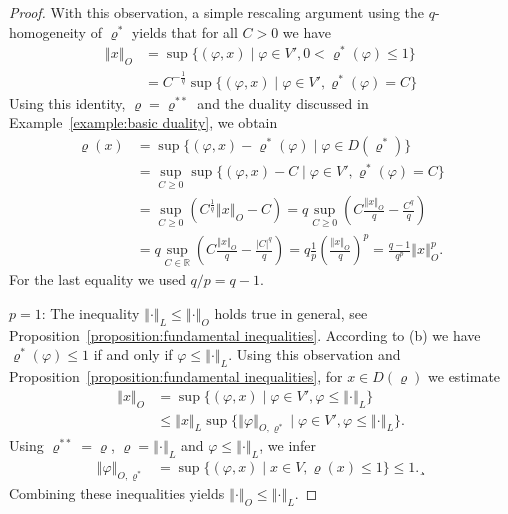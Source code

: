 \documentclass[a4paper,11pt,reqno]{amsart}
\theoremstyle{definition}
\numberwithin{equation}{section}
\newcommand{\R}{{\mathbb R}}
\newcommand{\vr}{{\varrho}}
\newcommand{\av}[1]{\left\Vert #1\right\Vert}
\newcommand{\1}{\mathds{1}}
\begin{document}
\begin{proof}
With  this observation, a simple rescaling argument using the $q$-homogeneity of $\vr^*$ yields that for all $C > 0$ we have
%
\begin{align*}
 \av{x}_O &= \sup \{(\varphi,x) \mid \varphi \in V', 0 <  \vr^*(\varphi) \leq 1 \}\\
 &= C^{-\frac{1}{q}} \sup \{(\varphi,x) \mid \varphi \in V', \vr^*(\varphi) = C\}
\end{align*}
%
 Using this identity, $\vr = \vr^{**}$ and the duality discussed in Example~\ref{example:basic duality},  we obtain 
 \begin{align*}
  \vr(x) &= \sup\{(\varphi,x) - \vr^*(\varphi) \mid \varphi \in D(\vr^*)\} \\
  &= \sup_{C \geq 0} \sup \{ (\varphi,x) - C \mid \varphi \in V', \vr^*(\varphi) = C\}\\
  &=  \sup_{C \geq 0}  \left(C^\frac{1}{q} \av{x}_O - C \right) = q \sup_{C \geq 0}  \left(C \frac{\av{x}_O}{q} - \frac{C^q}{q} \right) \\
  &= q \sup_{C \in \R}  \left(C \frac{\av{x}_O}{q} - \frac{|C|^q}{q} \right)  = q \frac{1}{p} \left(\frac{\av{x}_O}{q}\right)^p = \frac{q-1}{q^p} \av{x}_O^p.
 \end{align*}
%
For the last equality we used $q/p = q - 1$. 

 $p = 1$: The inequality $\av{\cdot}_L \leq \av{\cdot}_O$ holds true in general, see Proposition~\ref{proposition:fundamental inequalities}. According to (b) we have  $\vr^*(\varphi) \leq 1$ if and only if $\varphi \leq \av{\cdot}_L$. Using this observation and  Proposition~\ref{proposition:fundamental inequalities},  for  $x \in D(\vr)$ we estimate
 \begin{align*}
 \av{x}_O &= \sup\{(\varphi,x) \mid \varphi \in V', \varphi \leq \av{\cdot}_L\} \\
 &\leq \av{x}_L \sup\{ \av{\varphi}_{O,\vr^*} \mid \varphi \in V', \varphi \leq \av{\cdot}_L\}.
 \end{align*}
 Using $\vr^{**} = \vr$, $\vr = \av{\cdot}_L$ and $\varphi \leq \av{\cdot}_L$, we infer 
 \begin{align*}
 \av{\varphi}_{O,\vr^*} &= \sup \{(\varphi,x) \mid x \in V, \vr(x) \leq 1\} \leq 1.¸
 \end{align*}
%
Combining these inequalities yields $\av{\cdot}_O \leq \av{\cdot}_L$. 
%  
%  
% 
% 
% 
% 
%
\end{proof}
\end{document}
